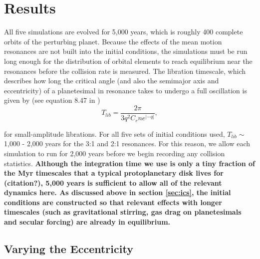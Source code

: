 \documentclass[fleqn,usenatbib]{mnras}
\begin{document}
\section{Results} \label{sec:results}

All five simulations are evolved for 5,000 years, which is roughly 400 complete orbits of the perturbing planet. Because the effects of the mean 
motion resonances are not built into the initial conditions, the simulations must be run long enough for the distribution of orbital elements to reach 
equilibrium near the resonances before the collision rate is measured. The libration timescale, which describes how long the critical angle (and also 
the semimajor axis and eccentricity) of a planetesimal in resonance takes to undergo a full oscillation is given by (see equation 8.47 in \citet{1999ssd..book.....M})
\begin{equation}\label{eq:lib_time}
	T_{lib} = \frac{2 \pi}{3 q^{2} C_{r} n e^{\left| -q \right|}},
\end{equation}

\noindent for small-amplitude librations. For all five sets of initial conditions used, $T_{lib} \sim$ 1,000 - 2,000 years for the 3:1 and 2:1 resonances. 
For this reason, we allow each simulation to run for 2,000 years before we begin recording any collision statistics. \textbf{Although the integration time we use
is only a tiny fraction of the Myr timescales that a typical protoplanetary disk lives for (citation?), 5,000 years is sufficient to allow all of the relevant dynamics here.
As discussed above in section \ref{sec:ics}, the initial conditions are constructed so that relevant effects with longer timescales (such as gravitational stirring, gas drag on planetesimals and secular forcing) are already in equilibrium.}

\subsection{Varying the Eccentricity} \label{sec:vary_ecc}
\end{document}
